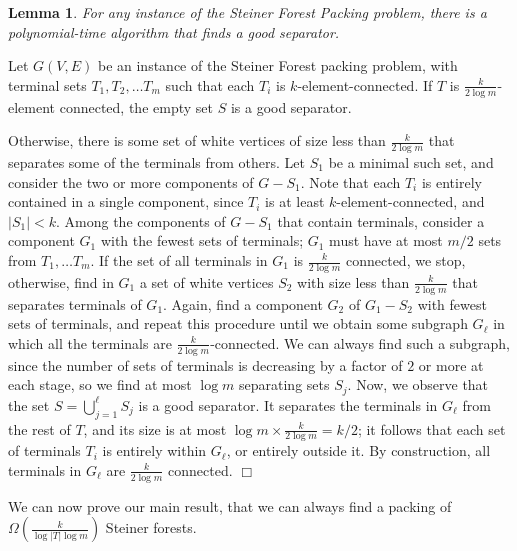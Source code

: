 \documentclass[11pt]{article}
\newtheorem{lemma}{Lemma}[section]
\renewenvironment{proof}{\vspace{-0.1in}\noindent{\bf Proof:}}{\hspace*{\fill}$\Box$\par}
\begin{document}
\begin{lemma}\label{lem:separator}
  For any instance of the Steiner Forest Packing problem, there is a
  polynomial-time algorithm that finds a good separator.
\end{lemma}
\begin{proof}
  Let $G(V,E)$ be an instance of the Steiner Forest packing problem,
  with terminal sets $T_1, T_2, \ldots T_m$ such that each $T_i$ is
  $k$-element-connected.  If $T$ is $\frac{k}{2 \log m}$-element
  connected, the empty set $S$ is a good separator.

  Otherwise, there is some set of white vertices of size less than
  $\frac{k}{2 \log m}$ that separates some of the terminals from
  others. Let $S_1$ be a minimal such set, and consider the two or
  more components of $G - S_1$. Note that each $T_i$ is entirely
  contained in a single component, since $T_i$ is at least
  $k$-element-connected, and $|S_1| < k$. Among the components of
  $G-S_1$ that contain terminals, consider a component $G_1$ with the
  fewest sets of terminals; $G_1$ must have at most $m/2$ sets from
  $T_1, \ldots T_m$. If the set of all terminals in $G_1$ is
  $\frac{k}{2 \log m}$ connected, we stop, otherwise, find in $G_1$ a
  set of white vertices $S_2$ with size less than $\frac{k}{2 \log m}$
  that separates terminals of $G_1$.  Again, find a component $G_2$ of
  $G_1 - S_2$ with fewest sets of terminals, and repeat this procedure
  until we obtain some subgraph $G_\ell$ in which all the terminals
  are $\frac{k}{2 \log m}$-connected.  We can always find such a
  subgraph, since the number of sets of terminals is decreasing by a
  factor of $2$ or more at each stage, so we find at most $\log m$
  separating sets $S_j$.  Now, we observe that the set $S = \bigcup_{j
    = 1}^{\ell} S_j$ is a good separator. It separates the terminals
  in $G_\ell$ from the rest of $T$, and its size is at most $\log m
  \times \frac{k}{2 \log m} = k/2$; it follows that each set of
  terminals $T_i$ is entirely within $G_\ell$, or entirely outside
  it. By construction, all terminals in $G_\ell$ are $\frac{k}{2 \log
    m}$ connected.
\end{proof}


We can now prove our main result, that we can always find a packing of
$\Omega(\frac{k}{\log |T| \log m})$ Steiner forests.
\end{document}
